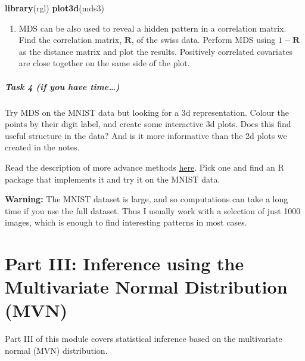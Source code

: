 \documentclass[
]{book}
\newenvironment{Shaded}{\begin{snugshade}}{\end{snugshade}}
\newcommand{\FunctionTok}[1]{\textcolor[rgb]{0.13,0.29,0.53}{\textbf{#1}}}
\newcommand{\NormalTok}[1]{#1}
\providecommand{\tightlist}{%
  \setlength{\itemsep}{0pt}\setlength{\parskip}{0pt}}
\theoremstyle{definition}
\theoremstyle{definition}
\theoremstyle{definition}
\theoremstyle{definition}
\theoremstyle{remark}
\begin{document}
\begin{Shaded}
\begin{Highlighting}[]
\FunctionTok{library}\NormalTok{(rgl)}
\FunctionTok{plot3d}\NormalTok{(mds3)}
\end{Highlighting}
\end{Shaded}

\begin{enumerate}
\def\labelenumi{\roman{enumi}.}
\setcounter{enumi}{2}
\tightlist
\item
  MDS can be also used to reveal a hidden pattern in a correlation matrix. Find the correlation matrix, \(\mathbf R\), of the swiss data. Perform MDS using \(1-\mathbf R\) as the distance matrix and plot the results. Positively correlated covariates are close together on the same side of the plot.
\end{enumerate}

\paragraph*{Task 4 (if you have time\ldots)}\label{task-4-if-you-have-time}

Try MDS on the MNIST data but looking for a 3d representation. Colour the points by their digit label, and create some interactive 3d plots. Does this find useful structure in the data? And is it more informative than the 2d plots we created in the notes.

Read the description of more advance methods \href{https://colah.github.io/posts/2014-10-Visualizing-MNIST/}{here}. Pick one and find an R package that implements it and try it on the MNIST data.

\textbf{Warning:} The MNIST dataset is large, and so computations can take a long time if you use the full dataset. Thus I usually work with a selection of just 1000 images, which is enough to find interesting patterns in most cases.

\chapter*{Part III: Inference using the Multivariate Normal Distribution (MVN)}\label{part-iii-inference-using-the-multivariate-normal-distribution-mvn}

Part III of this module covers statistical inference based on the multivariate normal (MVN) distribution.
\end{document}
